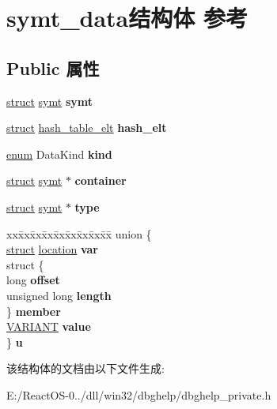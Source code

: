 \hypertarget{structsymt__data}{}\section{symt\+\_\+data结构体 参考}
\label{structsymt__data}
\subsection*{Public 属性}
\begin{DoxyCompactItemize}
\item 
\mbox{\label{structsymt__data_a57098989fb51ca623fc24579d9f6a857}} 
\hyperlink{interfacestruct}{struct} \hyperlink{structsymt}{symt} {\bfseries symt}
\item 
\mbox{\label{structsymt__data_a9662ea5c6c346d5f09be14a617ba6365}} 
\hyperlink{interfacestruct}{struct} \hyperlink{structhash__table__elt}{hash\+\_\+table\+\_\+elt} {\bfseries hash\+\_\+elt}
\item 
\mbox{\label{structsymt__data_ae0da4dbf1d99650fc387acef62a35a8d}} 
\hyperlink{interfaceenum}{enum} Data\+Kind {\bfseries kind}
\item 
\mbox{\label{structsymt__data_a5b812a2989f442a1b1e789aad1bf6bda}} 
\hyperlink{interfacestruct}{struct} \hyperlink{structsymt}{symt} $\ast$ {\bfseries container}
\item 
\mbox{\label{structsymt__data_a0e70b52b087c675827f89d982fd85e8c}} 
\hyperlink{interfacestruct}{struct} \hyperlink{structsymt}{symt} $\ast$ {\bfseries type}
\item 
\mbox{\label{structsymt__data_a6493da5374dfca3cd5ae6e4b01811028}} 
\begin{tabbing}
xx\=xx\=xx\=xx\=xx\=xx\=xx\=xx\=xx\=\kill
union \{\\
\>\hyperlink{interfacestruct}{struct} \hyperlink{structlocation}{location} {\bfseries var}\\
\>struct \{\\
\>\>long {\bfseries offset}\\
\>\>unsigned long {\bfseries length}\\
\>\} {\bfseries member}\\
\>\hyperlink{structtag_v_a_r_i_a_n_t}{VARIANT} {\bfseries value}\\
\} {\bfseries u}\\

\end{tabbing}\end{DoxyCompactItemize}


该结构体的文档由以下文件生成\+:\begin{DoxyCompactItemize}
\item 
E\+:/\+React\+O\+S-\/0../dll/win32/dbghelp/dbghelp\+\_\+private.\+h\end{DoxyCompactItemize}
